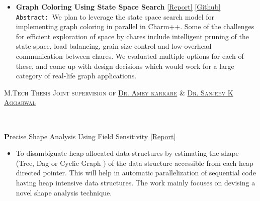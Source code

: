 \documentclass[9pt]{article}
\newenvironment{changemargin}[2]{%
  \begin{list}{}{%
    \setlength{\topsep}{0pt}%
    \setlength{\leftmargin}{#1}%
    \setlength{\rightmargin}{#2}%
    \setlength{\listparindent}{\parindent}%
    \setlength{\itemindent}{\parindent}%
    \setlength{\parsep}{\parskip}%
  }%
  \item[]}{\end{list}
}
\newcommand{\lineover}{
	\begin{changemargin}{-0.05in}{-0.05in}
		\vspace*{-8pt}
		\hrulefill \\
		\vspace*{-2pt}
	\end{changemargin}
}
\newcommand{\header}[1]{
	\begin{changemargin}{-0.5in}{-0.5in}
		\scshape{#1}\\
  	\lineover
	\end{changemargin}
}
\newenvironment{body} {
	\vspace*{-16pt}
	\begin{changemargin}{-0.25in}{-0.5in}
  }	
	{\end{changemargin}
}
\begin{document}
\begin{body}
\begin{itemize}
           \item \textbf{Graph Coloring Using State Space Search} 
           \href{http://web.engr.illinois.edu/~sdasgup3/Document/CS598_project_proposal.pdf}{[Report]} 
           \href{https://github.com/sdasgup3/ParallelSudoku}{[Github]} \\          
                                  \texttt{Abstract: }We plan to leverage the state space
                                  search model for implementing graph coloring
                                  in parallel in Charm++. Some of the
                                  challenges for efficient exploration of space
                                  by chares include intelligent pruning of the
                                  state space, load balancing, grain-size
                                  control and low-overhead communication
                                  between chares. We evaluated multiple options
                                  for each of these, and come up with design
                                  decisions which would work for a large
                                  category of real-life graph applications.
	\end{itemize}
\end{body}

\smallskip

\header{M.Tech Thesis \hfill Joint supervision of \href{http://www.cse.iitk.ac.in/users/karkare/}{Dr. Amey karkare} \& \href{http://www.cse.iitk.ac.in/users/ska/}{Dr.  Sanjeev K Aggarwal} }

\begin{body}
	\vspace{14pt}
	\textbf Precise Shape Analysis Using Field Sensitivity {\href{http://www.cse.iitk.ac.in/users/karkare/MTP/2010-11/sandeep2010precise.pdf}{[Report]}} \\
		\begin{itemize} \itemsep -0pt  
		\item[] To disambiguate heap allocated data-structures by estimating the shape (Tree, Dag or Cyclic Graph ) of the data structure 
			accessible from each heap directed pointer. This will help in automatic parallelization of sequential code having heap 
			intensive data structures. The work mainly focuses on devising a novel shape analysis technique. 
		\end{itemize}
\end{body}
\end{document}
